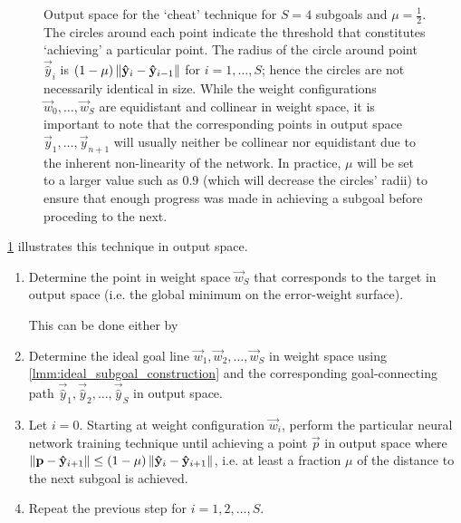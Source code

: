 \begin{figure}
    \caption{Output space for the `cheat' technique for $S=4$ subgoals and $\mu=\frac{1}{2}$. The circles around each point indicate the threshold that constitutes `achieving' a particular point. The radius of the circle around point $\vec{\hat{y}}_i$ is $(1-\mu) \left\lVert\mathbf{\hat{y}}_i-\mathbf{\hat{y}}_{i-1}\right\rVert$ for $i=1, \dots, S$; hence the circles are not necessarily identical in size. While the weight configurations $\vec{w}_0, \dots, \vec{w}_S$ are equidistant and collinear in weight space, it is important to note that the corresponding points in output space $\vec{y}_1, \dots, \vec{y}_{n+1}$ will usually neither be collinear nor equidistant due to the inherent non-linearity of the network. In practice, $\mu$ will be set to a larger value such as $0.9$ (which will decrease the circles' radii) to ensure that enough progress was made in achieving a subgoal before proceding to the next.}
    \label{fig:cheat_technique}
\end{figure}
\ref{fig:cheat_technique} illustrates this technique in output space.
\begin{enumerate}
    \item Determine the point in weight space $\vec{w}_S$ that corresponds to the target in output space (i.e. the global minimum on the error-weight surface). 
        
        This can be done either by
    
    \item Determine the ideal goal line $\vec{w}_1,\vec{w}_2,\dots,\vec{w}_S$ in weight space using \ref{lmm:ideal_subgoal_construction} and the corresponding goal-connecting path $\vec{\hat{y}}_1,\vec{\hat{y}}_2,\dots,\vec{\hat{y}}_S$ in output space.
    \item Let $i=0$. Starting at weight configuration $\vec{w}_i$, perform the particular neural network training technique until achieving a point $\vec{p}$ in output space where $\left\lVert\mathbf{p} - \mathbf{\hat{y}}_{i+1}\right\rVert \leq (1-\mu) \left\lVert\mathbf{\hat{y}}_i - \mathbf{\hat{y}}_{i+1}\right\rVert$, i.e. at least a fraction $\mu$ of the distance to the next subgoal is achieved.
    \item Repeat the previous step for $i=1, 2, \dots, S$.
\end{enumerate}
